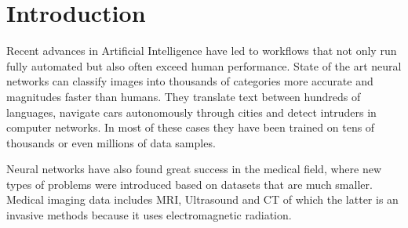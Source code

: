 \section{Introduction}

Recent advances in Artificial Intelligence have led to workflows that not only run fully automated but also often exceed human performance. State of the art neural networks can classify images into thousands of categories more accurate and magnitudes faster than humans. They translate text between hundreds of languages, navigate cars autonomously through cities and detect intruders in computer networks. In most of these cases they have been trained on tens of thousands or even millions of data samples. 

Neural networks have also found great success in the medical field, where new types of problems were introduced based on datasets that are much smaller. Medical imaging data includes MRI, Ultrasound and CT of which the latter is an invasive methods because it uses electromagnetic radiation.

\newpage
